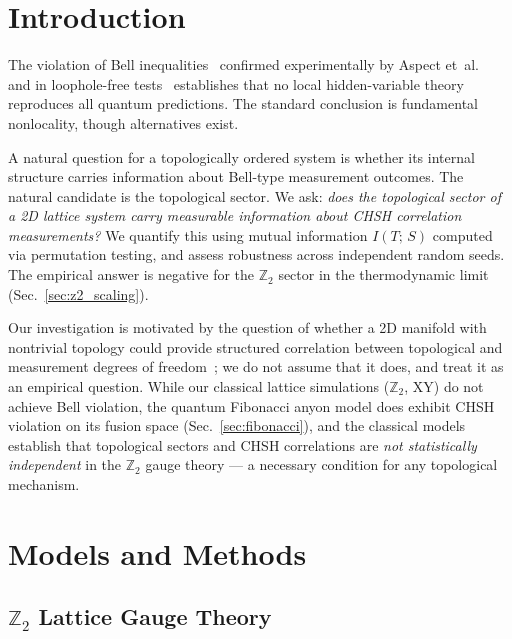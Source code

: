 \documentclass[aps,pra,twocolumn,superscriptaddress,showpacs,floatfix]{revtex4-2}
\newcommand{\Ztwo}{\mathbb{Z}_2}
\newcommand{\MI}{I(T;\,S)}
\begin{document}
\maketitle



\section{Introduction}
\label{sec:intro}

The violation of Bell inequalities~\cite{Bell1964} confirmed experimentally by
Aspect et~al.~\cite{Aspect1982} and in loophole-free tests~\cite{Hensen2015,Giustina2015}
establishes that no local hidden-variable theory reproduces all quantum
predictions. The standard conclusion is fundamental nonlocality, though
alternatives exist.

A natural question for a topologically ordered system is whether its internal
structure carries information about Bell-type measurement outcomes. The natural
candidate is the topological sector. We ask: \emph{does the topological sector of
a 2D lattice system carry measurable information about CHSH correlation
measurements?} We quantify this using mutual information $\MI$ computed via
permutation testing, and assess robustness across independent random seeds. The
empirical answer is negative for the $\Ztwo$ sector in the thermodynamic limit
(Sec.~\ref{sec:z2_scaling}).

Our investigation is motivated by the question of whether a 2D manifold with
nontrivial topology could provide structured correlation between topological
and measurement degrees of freedom~\cite{Sayim2026chsh}; we do not assume that
it does, and treat it as an empirical question.
While our classical lattice simulations ($\Ztwo$, XY) do not achieve Bell
violation, the quantum Fibonacci anyon model does exhibit CHSH violation on its
fusion space (Sec.~\ref{sec:fibonacci}),
and the classical models establish
that topological sectors and CHSH correlations are \emph{not statistically
independent} in the $\Ztwo$ gauge theory --- a necessary condition for any
topological mechanism.

\section{Models and Methods}
\label{sec:methods}

\subsection{$\Ztwo$ Lattice Gauge Theory}
\end{document}
